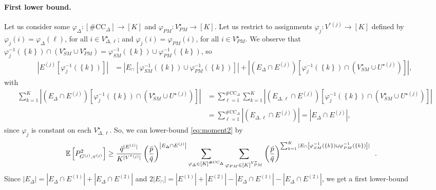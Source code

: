 \documentclass[final]{colt2026}
\newcommand{\1}{\mathbf{1}}
\newcommand{\bbE}{\mathbb{E}}
\newcommand{\pa}[1]{\left(#1\right)}
\newcommand{\ac}[1]{\left\{#1\right\}}
\newcommand{\cro}[1]{\left[#1\right]}
\begin{document}
\paragraph{First lower bound.}
Let us consider some $\varphi_{\Delta}:[\#\mathrm{CC}_{\Delta}]\to[K]$ and  $\varphi_{PM}:V^{\star}_{PM}\to [K]$.
Let us restrict to assignments $\varphi_{j}:V^{^{\star}(j)}\to[K]$ defined by $\varphi_j(i)=\varphi_{\Delta}(\ell)$, for all $i\in V^{\star}_{\Delta,\ell}$; and $\varphi_j(i)=\varphi_{PM}(i)$, for all $i\in V^{\star}_{PM}$. 
We observe that $\varphi_{j}^{-1}(\ac{k}) \cap (V^{\star}_{SM}\cup V^{\star}_{PM})=\varphi_{SM}^{-1}(\ac{k})\cup\varphi_{PM}^{-1}(\ac{k})$, so 
\begin{align}
\left|E^{(j)}\cro{\varphi_{j}^{-1}(\ac{k})}\right| & = \left| E_{\cap}\cro{\varphi_{SM}^{-1}(\ac{k})\cup\varphi_{PM}^{-1}(\ac{k})}\right| + \left| \pa{E_{\Delta}\cap E^{(j)}}\cro{\varphi_{j}^{-1}(\ac{k})\cap \pa{V^{\star}_{SM}\cup U^{\star(j)}}}\right|, \label{eq:decomp:simple-double}
\end{align}
with
\begin{align}
\sum_{k=1}^K \left|\pa{E_{\Delta}\cap E^{(j)}}\cro{\varphi_{j}^{-1}(\ac{k})\cap \pa{V^{\star}_{SM}\cup U^{\star(j)}}} \right|
& = \sum_{\ell =1}^{\#\mathrm{CC}_{\Delta}}\sum_{k=1}^K \left|\pa{E_{\Delta,\ell}\cap E^{(j)}}\cro{\varphi_{j}^{-1}(\ac{k})\cap \pa{V^{\star}_{SM}\cup U^{\star(j)}}}\right|\nonumber\\
& = \sum_{\ell =1}^{\#\mathrm{CC}_{\Delta}} \left|\pa{E_{\Delta,\ell}\cap E^{(j)}} \right|
 = \left|E_{\Delta}\cap E^{(j)}\right|, \label{eq:partition:pure}
\end{align}
since $\varphi_{j}$ is constant on each $V^{\star}_{\Delta,\ell}$.
So, we can lower-bound \eqref{eq:moment2} by
\begin{align}
\bbE\cro{P_{G^{(j)}, \pi^{(j)}}^2} & \geq  {\bar q^{|E^{(j)}|}\over K^{|V^{^{\star}(j)}|}} \pa{\bar p \over \bar q}^{\left|E_{\Delta}\cap E^{(j)}\right|}  \sum_{\varphi_{\Delta}\in [K]^{\#\mathrm{CC}_{\Delta}}} \sum_{\varphi_{PM}\in [K]^{V^{\star}_{PM}}}  \pa{\bar p\over \bar q}^{\sum_{k=1}^K|E_{\cap}\cro{\varphi_{SM}^{-1}(\ac{k})\cup\varphi_{PM}^{-1}(\ac{k})}|}\enspace . \nonumber
\end{align}
Since $|E_{\Delta}|=|E_{\Delta}\cap E^{(1)}|+|E_{\Delta}\cap E^{(2)}|$ and
$2|E_{\cap}|=|E^{(1)}|+|E^{(2)}|-|E_{\Delta}\cap E^{(1)}|- |E_{\Delta}\cap E^{(2)}|$,
we get a first lower-bound
\end{document}
